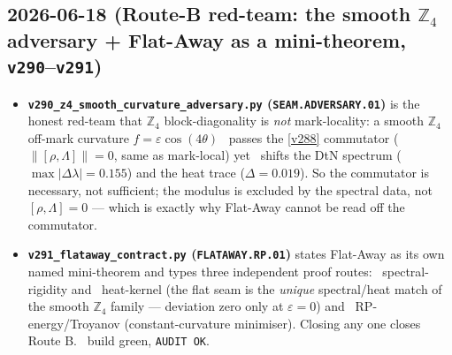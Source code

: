 \subsection*{2026-06-18 (Route-B red-team: the smooth $\mathbb{Z}_4$ adversary + Flat-Away as a mini-theorem, \texttt{v290}--\texttt{v291})}
\begin{itemize}
\item \textbf{\texttt{v290\_z4\_smooth\_curvature\_adversary.py} (\texttt{SEAM.ADVERSARY.01})} is the honest
  red-team that $\mathbb{Z}_4$ block-diagonality is \emph{not} mark-locality: a smooth $\mathbb{Z}_4$
  off-mark curvature $f=\varepsilon\cos(4\theta)$ \mE\ passes the \vref{v288} commutator
  ($\|[\rho,\Lambda]\|=0$, same as mark-local) yet \mE\ shifts the DtN spectrum ($\max|\Delta\lambda|=0.155$)
  and the heat trace ($\Delta=0.019$). So the commutator is necessary, not sufficient; the modulus is
  excluded by the spectral data, not $[\rho,\Lambda]{=}0$ --- which is exactly why Flat-Away cannot be
  read off the commutator.
\item \textbf{\texttt{v291\_flataway\_contract.py} (\texttt{FLATAWAY.RP.01})} states Flat-Away as its own
  named mini-theorem and types three independent proof routes: \mE\ spectral-rigidity and \mE\ heat-kernel
  (the flat seam is the \emph{unique} spectral/heat match of the smooth $\mathbb{Z}_4$ family --- deviation
  zero only at $\varepsilon{=}0$) and \mC\ RP-energy/Troyanov (constant-curvature minimiser). Closing any one
  closes Route B. \mE\ build green, \texttt{AUDIT OK}.
\end{itemize}

